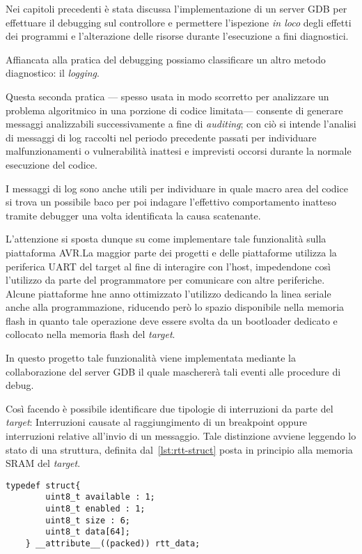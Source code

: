 Nei capitoli precedenti è stata discussa l'implementazione di un server GDB per effettuare il debugging sul controllore e permettere l'ispezione \textit{in loco} degli effetti dei programmi e l'alterazione delle risorse durante l'esecuzione a fini diagnostici. 

Affiancata alla pratica del debugging possiamo classificare un altro metodo diagnostico: il \textit{logging}.

Questa seconda pratica --- spesso usata in modo scorretto per analizzare un problema algoritmico in una porzione di codice limitata--- consente di generare messaggi analizzabili successivamente a fine di \textit{auditing}; con ciò si intende l'analisi di messaggi di log raccolti nel periodo precedente passati per individuare malfunzionamenti o vulnerabilità inattesi e imprevisti occorsi durante la normale esecuzione del codice.

I messaggi di log sono anche utili per individuare in quale macro area del codice si trova un possibile baco per poi indagare l'effettivo comportamento inatteso tramite debugger una volta identificata la causa scatenante.

L'attenzione si sposta dunque su come implementare tale funzionalità sulla piattaforma AVR.\@ La maggior parte dei progetti e delle piattaforme utilizza la periferica UART del target al fine di interagire con l'host, impedendone così l'utilizzo da parte del programmatore per comunicare con altre periferiche. Alcune piattaforme hne anno ottimizzato l'utilizzo dedicando la linea seriale anche alla programmazione, riducendo però lo spazio disponibile nella memoria flash in quanto tale operazione deve essere svolta da un bootloader dedicato e collocato nella memoria flash del \textit{target}. 

In questo progetto tale funzionalità viene implementata %
mediante la collaborazione del server GDB il quale maschererà tali eventi alle procedure di debug.

Così facendo è possibile identificare due tipologie di interruzioni da parte del \textit{target}: Interruzioni causate al raggiungimento di un breakpoint oppure interruzioni relative all'invio di un messaggio. Tale distinzione avviene leggendo lo stato di una struttura, definita dal~\cref{lst:rtt-struct} posta in principio alla memoria SRAM del \textit{target}.

\noindent\begin{minipage}{\textwidth}
    \begin{lstlisting}[style=C, caption={Struttura utilizzata per il salvataggio dei riferimenti ai breakpoint software}, label=lst:rtt-struct]
    typedef struct{
        uint8_t available : 1;
        uint8_t enabled : 1;
        uint8_t size : 6;
        uint8_t data[64];
    } __attribute__((packed)) rtt_data;
    \end{lstlisting}
\end{minipage}

